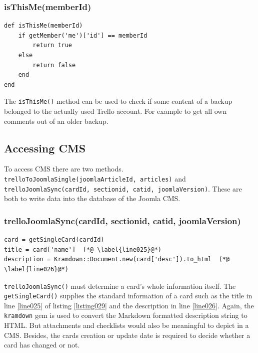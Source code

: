 \subsubsection{isThisMe(memberId)}
\begin{lstlisting}[aboveskip=1\baselineskip, caption= isThisMe(), label=listing059]
def isThisMe(memberId)
	if getMember('me')['id'] == memberId
		return true
	else
		return false
	end
end
\end{lstlisting}

The \lstinline{isThisMe()} method can be used to check if some content of a backup belonged to the actually used Trello account. For example to get all own comments out of an older backup.

\subsection{Accessing CMS}
To access CMS there are two methods. \lstinline{trelloToJoomlaSingle(joomlaArticleId, articles)} and \lstinline{trelloJoomlaSync(cardId, sectionid, catid, joomlaVersion)}. These are both to write data into the database of the Joomla CMS.


\subsubsection{trelloJoomlaSync(cardId, sectionid, catid, joomlaVersion)}

\begin{lstlisting}[aboveskip=1\baselineskip, caption=Getting standard card information., label=listing029]
card = getSingleCard(cardId)
title = card['name']  (*@ \label{line025}@*)
description = Kramdown::Document.new(card['desc']).to_html  (*@ \label{line026}@*)
\end{lstlisting}

\lstinline{trelloJoomlaSync()} must determine a card's whole information itself. The \lstinline{getSingleCard()} supplies the standard information of a card such as the title in line \ref{line025} of listing \ref{listing029} and the description in line \ref{line026}. Again, the \texttt{kramdown} gem is used to convert the Markdown formatted description string to HTML. But attachments and checklists would also be meaningful to depict in a CMS. Besides, the cards creation or update date is required to decide whether a card has changed or not.

\vskip 6cm

